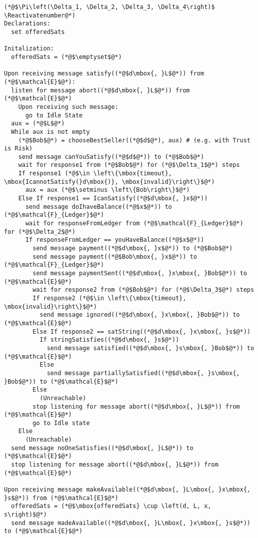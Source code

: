 \Suppressnumber
\begin{lstlisting}[label=protocol, style=numbers]
(*@$\Pi\left(\Delta_1, \Delta_2, \Delta_3, \Delta_4\right)$ \Reactivatenumber@*)
Declarations:
  set offeredSats

Initalization:
  offeredSats = (*@$\emptyset$@*)

Upon receiving message satisfy((*@$d\mbox{, }L$@*)) from (*@$\mathcal{E}$@*):
  listen for message abort((*@$d\mbox{, }L$@*)) from (*@$\mathcal{E}$@*)
    Upon receiving such message:
      go to Idle State
  aux = (*@$L$@*)
  While aux is not empty
    (*@$Bob$@*) = chooseBestSeller((*@$d$@*), aux) # (e.g. with Trust is Risk)
    send message canYouSatisfy((*@$d$@*)) to (*@$Bob$@*)
    wait for response1 from (*@$Bob$@*) for (*@$\Delta_1$@*) steps
    If response1 (*@$\in \left\{\mbox{timeout}, \mbox{IcannotSatisfy(}d\mbox{)}, \mbox{invalid}\right\}$@*)
      aux = aux (*@$\setminus \left\{Bob\right\}$@*)
    Else If response1 == IcanSatisfy((*@$d\mbox{, }x$@*))
      send message doIhaveBalance((*@$x$@*)) to (*@$\mathcal{F}_{Ledger}$@*)
      wait for responseFromLedger from (*@$\mathcal{F}_{Ledger}$@*) for (*@$\Delta_2$@*)
      If responseFromLedger == youHaveBalance((*@$x$@*))
        send message payment((*@$d\mbox{, }x$@*)) to (*@$Bob$@*)
        send message payment((*@$Bob\mbox{, }x$@*)) to (*@$\mathcal{F}_{Ledger}$@*)
        send message paymentSent((*@$d\mbox{, }x\mbox{, }Bob$@*)) to (*@$\mathcal{E}$@*)
        wait for response2 from (*@$Bob$@*) for (*@$\Delta_3$@*) steps
        If response2 (*@$\in \left\{\mbox{timeout}, \mbox{invalid}\right\}$@*)
          send message ignored((*@$d\mbox{, }x\mbox{, }Bob$@*)) to (*@$\mathcal{E}$@*)
        Else If response2 == satString((*@$d\mbox{, }x\mbox{, }s$@*))
          If stringSatisfies((*@$d\mbox{, }s$@*))
            send message satisfied((*@$d\mbox{, }s\mbox{, }Bob$@*)) to (*@$\mathcal{E}$@*)
          Else
            send message partiallySatisfied((*@$d\mbox{, }s\mbox{, }Bob$@*)) to (*@$\mathcal{E}$@*)
        Else
          (Unreachable)
        stop listening for message abort((*@$d\mbox{, }L$@*)) from (*@$\mathcal{E}$@*)
        go to Idle state
    Else
      (Unreachable)
  send message noOneSatisfies((*@$d\mbox{, }L$@*)) to (*@$\mathcal{E}$@*)
  stop listening for message abort((*@$d\mbox{, }L$@*)) from (*@$\mathcal{E}$@*)

Upon receiving message makeAvailable((*@$d\mbox{, }L\mbox{, }x\mbox{, }s$@*)) from (*@$\mathcal{E}$@*)
  offeredSats = (*@$\mbox{offeredSats} \cup \left(d, L, x, s\right)$@*)
  send message madeAvailable((*@$d\mbox{, }L\mbox{, }x\mbox{, }s$@*)) to (*@$\mathcal{E}$@*)


\end{lstlisting}

